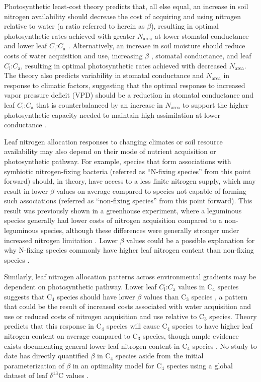 Photosynthetic least-cost theory predicts that, all else equal, an increase in soil nitrogen availability should decrease the cost of acquiring and using nitrogen relative to water (a ratio referred to herein as $\beta$), resulting in optimal photosynthetic rates achieved with greater $N_\mathrm{area}$ at lower stomatal conductance and lower leaf $C_\mathrm{i}$:$C_\mathrm{a}$ . Alternatively, an increase in soil moisture should reduce costs of water acquisition and use, increasing $\beta$ , stomatal conductance, and leaf $C_\mathrm{i}$:$C_\mathrm{a}$, resulting in optimal photosynthetic rates achieved with decreased $N_\mathrm{area}$. The theory also predicts variability in stomatal conductance and $N_\mathrm{area}$ in response to climatic factors, suggesting that the optimal response to increased vapor pressure deficit (VPD) should be a reduction in stomatal conductance and leaf $C_\mathrm{i}$:$C_\mathrm{a}$ that is counterbalanced by an increase in $N_\mathrm{area}$ to support the higher photosynthetic capacity needed to maintain high assimilation at lower conductance .

Leaf nitrogen allocation responses to changing climates or soil resource availability may also depend on their mode of nutrient acquisition or photosynthetic pathway. For example, species that form associations with symbiotic nitrogen-fixing bacteria (referred as “N-fixing species” from this point forward) should, in theory, have access to a less finite nitrogen supply, which may result in lower $\beta$ values on average compared to species not capable of forming such associations (referred as “non-fixing species” from this point forward). This result was previously shown in a greenhouse experiment, where a leguminous species generally had lower costs of nitrogen acquisition compared to a non-leguminous species, although these differences were generally stronger under increased nitrogen limitation . Lower $\beta$ values could be a possible explanation for why N-fixing species commonly have higher leaf nitrogen content than non-fixing species .

Similarly, leaf nitrogen allocation patterns across environmental gradients may be dependent on photosynthetic pathway. Lower leaf $C_\mathrm{i}$:$C_\mathrm{a}$ values in C$_4$ species suggests that C$_4$ species should have lower $\beta$ values than C$_3$ species , a pattern that could be the result of increased costs associated with water acquisition and use or reduced costs of nitrogen acquisition and use relative to C$_3$ species. Theory predicts that this response in C$_4$ species will cause C$_4$ species to have higher leaf nitrogen content on average compared to C$_3$ species, though ample evidence exists documenting general lower leaf nitrogen content in C$_4$ species . No study to date has directly quantified $\beta$ in C$_4$ species aside from the initial parameterization of $\beta$ in an optimality model for C$_4$ species  using a global dataset of leaf $\delta^{13}$C values .

